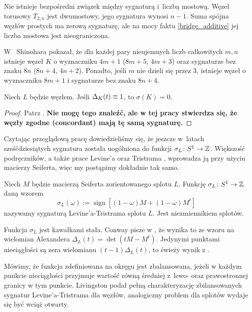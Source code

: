Nie istnieje bezpośredni związek między sygnaturą i~liczbą mostową.
Węzeł torusowy $T_{2,n}$ jest dwumostowy, jego sygnatura wynosi $n - 1$.
Suma spójna węzłów prostych ma zerową sygnaturę, ale na mocy faktu \ref{bridge_additive} jej liczba mostowa jest nieograniczona.

W~\cite{shinohara71} Shinohara pokazał, że dla każdej pary nieujemnych liczb całkowitych $m, n$ istnieje węzeł $K$ o wyznaczniku $4m+1$ ($8m+5$, $4m+3$) oraz sygnaturze bez znaku $8n$ ($8n+4$, $4n+2$).
Ponadto, jeśli $m$ nie dzieli się przez $3$, istnieje węzeł o wyznaczniku $8m+1$ i sygnaturze bez znaku $8n+4$.

\begin{proposition}
    Niech $L$ będzie węzłem.
    Jeśli $\Delta_K(t) \equiv 1$, to $\sigma (K) = 0$.
\end{proposition}

\begin{proof}
    Patrz \cite{milnor68}.
    \textbf{\color{red}Nie mogę tego znaleźć, ale w tej pracy stwierdza się, że węzły zgodne (concordant) mają tę samą sygnaturę.}
\end{proof}

Czytając przeglądową pracę \cite{conway19} dowiedzieliśmy się, że jeszcze w~latach sześćdziesiątych sygnatura została uogólniona do funkcji $\sigma_L \colon S^1 \to \mathbb Z$.
Większość podręczników, a także prace Levine'a \cite{levine69} oraz Tristrama \cite{tristram69}, wprowadza ją przy użyciu macierzy Seiferta, więc my postąpimy dokładnie tak samo.

\begin{definition}
    Niech $M$ będzie macierzą Seiferta zorientowanego splotu $L$.
    Funkcję $\sigma_L \colon S^1 \to \mathbb Z$ daną wzorem
    \begin{equation}
        \sigma_L(\omega) := \operatorname{sign} [(1-\omega) M + (1 - \overline{\omega})M^t]
    \end{equation}
    nazywamy sygnaturą Levine'a-Tristrama splotu $L$.
    Jest niezmiennikiem splotów.
\end{definition}

Funkcja $\sigma_L$ jest kawałkami stała.
Conway pisze w \cite{conway19}, że wynika to ze wzoru na wielomian Alexandera $\Delta_L(t) = \det(tM - M^t)$.
Jedynymi punktami nieciągłości są zera wielomianu $(t-1)\Delta_L(t)$, to świeży wynik z \cite{gilmer16}.

Mówimy, że funkcja zdefiniowana na okręgu jest zbalansowana, jeżeli w każdym punkcie nieciągłości przyjmuje wartość równą średniej z~lewo- oraz prawostronnej granicy w tym punkcie.
Livingston podał pełną charakteryzację zbilansowanych sygnatur Levine'a-Tristrama dla węzłów, analogiczny problem dla splotów wydaje się być wciąż otwarty.

